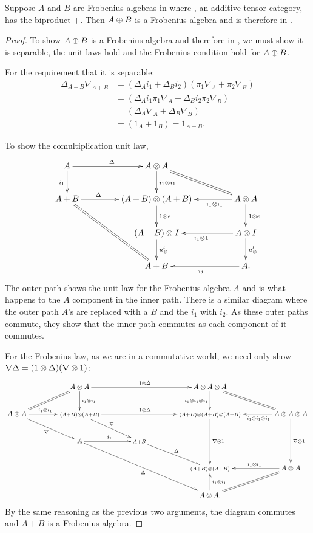 \begin{lemma}\label{prop:biproducts-of-frobenius-objects-are-frobenius}
  Suppose $A$ and $B$ are Frobenius algebras in \CFrob where \X, an additive tensor category, has
  the biproduct $+$.
  Then $A\oplus B$ is a Frobenius algebra and is therefore in \CFrob.
\end{lemma}
\begin{proof}

  To show $A\oplus B$ is a Frobenius algebra and therefore in \CFrob, we must show it is separable,
  the unit laws hold and the Frobenius condition hold for $A\oplus B$.

  For the requirement that it is separable:
  \begin{align*}
    \Delta_{A+B}\nabla_{A+B}&= (\Delta_A i_1 + \Delta_B i_2) (\pi_1 \nabla_A + \pi_2 \nabla_B)\\
    &=  (\Delta_A i_1 \pi_1 \nabla_A + \Delta_B i_2\pi_2 \nabla_B)\\
    &=  (\Delta_A \nabla_A + \Delta_B \nabla_B)\\
    &=  (1_A + 1_B) = 1_{A+B}.
  \end{align*}


  To show the comultiplication unit law,
  \[
     \xymatrix@C+20pt{
       A \ar[r]^{\Delta} \ar[d]_{i_1} & A\*A \ar[d]^{i_1\*i_1} \ar@{=}[dr] \\
       A+B \ar[r]^(.35){\Delta} \ar@{=}[ddr] &(A+B)\*(A+B) \ar[d]^{1\*\epsilon}
          & A\*A \ar[l]^(.35){i_1\*i_1}  \ar[d]^{1\*\epsilon}\\
       & (A+B)\*I \ar[d]^{\usl} & A\*I \ar[d]^{\usl} \ar[l]^{i_1\*1}\\
       & A+B & A. \ar[l]^{i_1}
     }
  \]
  The outer path shows the unit law for the Frobenius algebra $A$ and is what happens to the $A$
  component in the inner path. There is a similar diagram where the outer path $A$'s are replaced
  with a $B$ and the $i_1$ with $i_2$. As these outer paths commute, they show that the inner path
  commutes as each component of it commutes.

  For the Frobenius law, as we are in a commutative world, we need only show
  $\nabla \Delta = (1\otimes\Delta)(\nabla\otimes1)$:
  \[
  \xymatrix@C+17pt{
      &A\*A \ar@{=}[ld] \ar[rr]^{1\*\Delta} \ar[d]^{i_1\*i_1} && A\*A\*A  \ar[d]_{i_1\*i_1\*i_1} \ar@{=}[dr] \\
      A\*A \ar[r]^(.45){i_1\*i_1}  \ar[dr]_{\nabla}
         &\scriptstyle{(A+B)\*(A+B)} \ar[rr]^{1\*\Delta} \ar[dr]^{\nabla}
         &&\scriptstyle{(A+B)\*(A+B)\*(A+B)}  \ar[dd]^{\nabla\*1} & A\*A\*A  \ar[l]^(.4){i_1\*i_1\*i_1}  \ar[dd]^{\nabla\*1}\\
     & A \ar[r]^{i_1} \ar[ddrr]_{\Delta} & \scriptstyle{A+B} \ar[dr]^{\Delta} \\
     & & & \scriptstyle{(A+B)\*(A+B)} & A\*A  \ar[l]_(.45){i_1\*i_1} \ar@{=}[dl]\\
     & & & A\*A. \ar[u]_{i_1\*i_1}
    }
  \]
  By the same reasoning as the previous two arguments, the diagram commutes and $A+B$ is a Frobenius
  algebra.
\end{proof}

